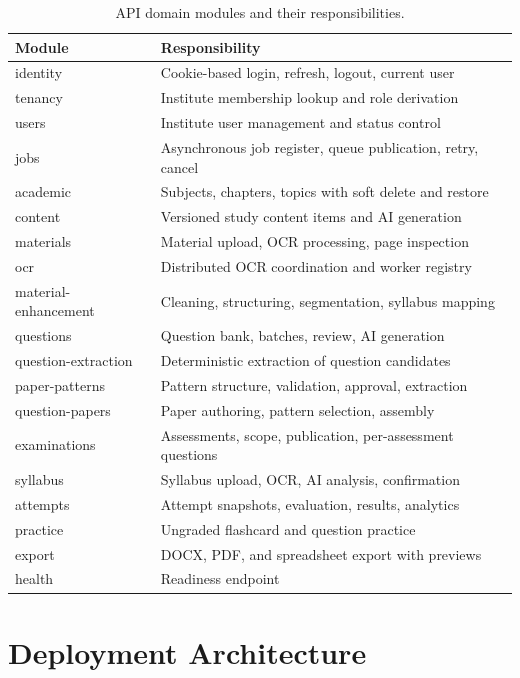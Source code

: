 \begin{table}[H]
\centering
\caption{API domain modules and their responsibilities.}
\label{tab:modules}
\small
\begin{tabular}{@{}l p{\dimexpr\textwidth-3.6cm-12pt\relax}@{}}
\toprule
\textbf{Module} & \textbf{Responsibility} \\
\midrule
identity & Cookie-based login, refresh, logout, current user \\
tenancy & Institute membership lookup and role derivation \\
users & Institute user management and status control \\
jobs & Asynchronous job register, queue publication, retry, cancel \\
academic & Subjects, chapters, topics with soft delete and restore \\
content & Versioned study content items and AI generation \\
materials & Material upload, OCR processing, page inspection \\
ocr & Distributed OCR coordination and worker registry \\
material-enhancement & Cleaning, structuring, segmentation, syllabus mapping \\
questions & Question bank, batches, review, AI generation \\
question-extraction & Deterministic extraction of question candidates \\
paper-patterns & Pattern structure, validation, approval, extraction \\
question-papers & Paper authoring, pattern selection, assembly \\
examinations & Assessments, scope, publication, per-assessment questions \\
syllabus & Syllabus upload, OCR, AI analysis, confirmation \\
attempts & Attempt snapshots, evaluation, results, analytics \\
practice & Ungraded flashcard and question practice \\
export & DOCX, PDF, and spreadsheet export with previews \\
health & Readiness endpoint \\
\bottomrule
\end{tabular}
\end{table}

\section{Deployment Architecture}

